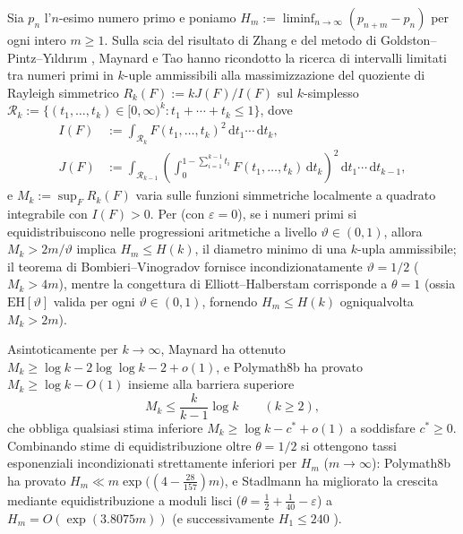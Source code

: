 \documentclass[11pt, reqno]{amsart}
\theoremstyle{remark}
\numberwithin{equation}{section}
\newcommand{\cR}{\mathcal{R}}
\newcommand{\dd}{\,\mathrm{d}}
\begin{document}
Sia $p_n$ l'$n$-esimo numero primo e poniamo $H_m := \liminf_{n\to\infty}(p_{n+m} - p_n)$ per ogni
intero $m \ge 1$. Sulla scia del risultato di Zhang \cite{Zhang} e del metodo di
Goldston--Pintz--Y{\i}ld{\i}r{\i}m \cite{GPY}, Maynard \cite{Maynard} e Tao hanno ricondotto la
ricerca di intervalli limitati tra numeri primi in $k$-uple ammissibili alla massimizzazione del
quoziente di Rayleigh simmetrico $R_k(F) := k J(F)/I(F)$ sul $k$-simplesso
$\cR_k := \{(t_1,\dots,t_k) \in [0,\infty)^k : t_1 + \cdots + t_k \le 1\}$, dove
\begin{align*}
I(F) &:= \int_{\cR_k} F(t_1,\dots,t_k)^2 \dd t_1\cdots \dd t_k, \\
J(F) &:= \int_{\cR_{k-1}} \left(\int_0^{1-\sum_{i=1}^{k-1} t_i}
F(t_1,\dots,t_k)\dd t_k \right)^{\!2} \dd t_1\cdots \dd t_{k-1},
\end{align*}
e $M_k := \sup_F R_k(F)$ varia sulle funzioni simmetriche localmente a quadrato integrabile con
$I(F) > 0$. Per \cite[Teoremi~22 e~26]{PM8b} (con $\varepsilon = 0$), se i numeri primi si equidistribuiscono nelle
progressioni aritmetiche a livello $\vartheta \in (0, 1)$, allora $M_k > 2m/\vartheta$ implica
$H_m \le H(k)$, il diametro minimo di una $k$-upla ammissibile; il teorema di Bombieri--Vinogradov
fornisce incondizionatamente $\vartheta = 1/2$ ($M_k > 4m$), mentre la congettura di Elliott--Halberstam
corrisponde a $\theta = 1$ (ossia $\mathrm{EH}[\vartheta]$ valida per ogni $\vartheta \in (0, 1)$,
fornendo $H_m \le H(k)$ ogniqualvolta $M_k > 2m$).

Asintoticamente per $k \to \infty$, Maynard \cite{Maynard} ha ottenuto
$M_k \ge \log k - 2\log\log k - 2 + o(1)$, e Polymath8b \cite[Sezione~6, Corollario~37]{PM8b}
ha provato $M_k \ge \log k - O(1)$ insieme alla barriera superiore
\begin{equation}\label{eq:pm8b-barrier}
M_k \le \frac{k}{k-1}\log k \qquad (k \ge 2),
\end{equation}
che obbliga qualsiasi stima inferiore $M_k \ge \log k - c^* + o(1)$ a soddisfare $c^* \ge 0$.
Combinando stime di equidistribuzione oltre $\theta = 1/2$ si ottengono tassi esponenziali
incondizionati strettamente inferiori per $H_m$ ($m \to \infty$): Polymath8b \cite{PM8b} ha provato
$H_m \ll m\exp\bigl((4-\tfrac{28}{157})m\bigr)$, e Stadlmann \cite{Stadlmann2025} ha migliorato la
crescita mediante equidistribuzione a moduli lisci ($\theta = \tfrac{1}{2}+\tfrac{1}{40}-\varepsilon$)
a $H_m = O(\exp(3.8075 m))$ (e successivamente $H_1 \le 240$ \cite{Stadlmann2026}).
\end{document}
